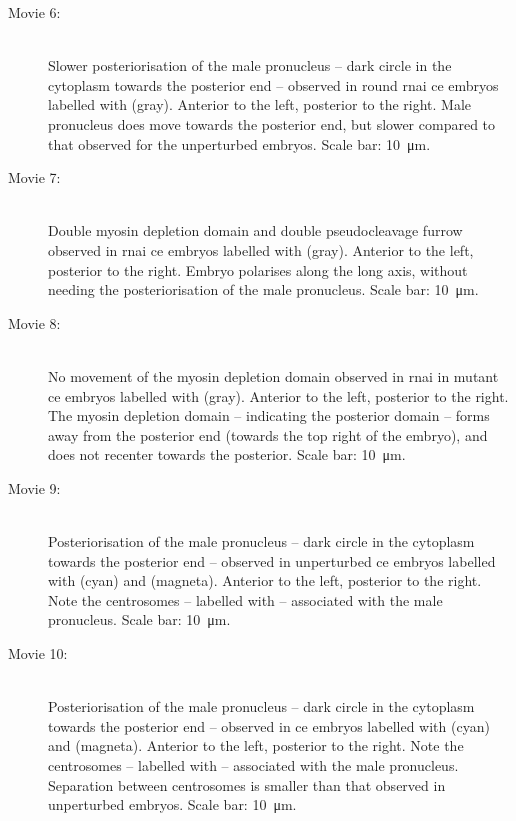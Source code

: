 \begin{description}
\item[Movie 6:]\hfill\\
Slower posteriorisation of the male pronucleus -- dark circle in the cytoplasm towards the posterior end -- observed in round  \ac{rnai} \ac{ce} embryos labelled with  (gray). Anterior to the left, posterior to the right. Male pronucleus does move towards the posterior end, but slower compared to that observed for the unperturbed embryos. Scale bar: \SI{10}{\micro\meter}.
\item[Movie 7:]\hfill\\
Double myosin depletion domain and double pseudocleavage furrow observed in  \ac{rnai} \ac{ce} embryos labelled with  (gray). Anterior to the left, posterior to the right. Embryo polarises along the long axis, without needing the posteriorisation of the male pronucleus. Scale bar: \SI{10}{\micro\meter}.
\item[Movie 8:]\hfill\\
No movement of the myosin depletion domain observed in  \ac{rnai} in  mutant \ac{ce} embryos labelled with  (gray). Anterior to the left, posterior to the right. The myosin depletion domain -- indicating the posterior domain -- forms away from the posterior end (towards the top right of the embryo), and does not recenter towards the posterior. Scale bar: \SI{10}{\micro\meter}.
\item[Movie 9:]\hfill\\
Posteriorisation of the male pronucleus -- dark circle in the cytoplasm towards the posterior end -- observed in unperturbed \ac{ce} embryos labelled with  (cyan) and  (magneta). Anterior to the left, posterior to the right. Note the centrosomes -- labelled with  -- associated with the male pronucleus. Scale bar: \SI{10}{\micro\meter}.
\item[Movie 10:]\hfill\\
Posteriorisation of the male pronucleus -- dark circle in the cytoplasm towards the posterior end -- observed in  \ac{ce} embryos labelled with  (cyan) and  (magneta). Anterior to the left, posterior to the right. Note the centrosomes -- labelled with  -- associated with the male pronucleus. Separation between centrosomes is smaller than that observed in unperturbed embryos. Scale bar: \SI{10}{\micro\meter}.
\end{description}

